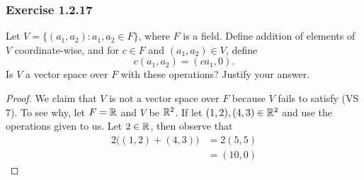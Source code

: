 \subsubsection{Exercise 1.2.17}

Let \( V = \{ (a_{1}, a_{2}) : a_{1}, a_{2} \in F   \}  \), where \( F  \) is a field. Define addition of elements of \( V  \) coordinate-wise, and for \( c \in F  \) and \( (a_{1} , a_{2}) \in V   \), define 
\[  c(a_{1}, a_{2} ) = (ca_{1}, 0 ).\]
Is \( V  \) a vector space over \( F  \) with these operations? Justify your answer.

\begin{proof}
We claim that \( V  \) is not a vector space over \( F  \) because \( V  \) fails to satisfy (VS 7). To see why, let \( F = \mathbb{R}  \) and \( V  \) be \( \mathbb{R}^{2}  \). If let \( (1,2), (4,3) \in \mathbb{R}^{2}  \) and use the operations given to us. Let \( 2 \in \mathbb{R}  \), then observe that 
\begin{align*}
    2 \Big( (1,2) + (4,3)  \Big) &= 2 (5 , 5) \\
                                 &= (10, 0)
\end{align*}
\end{proof}






